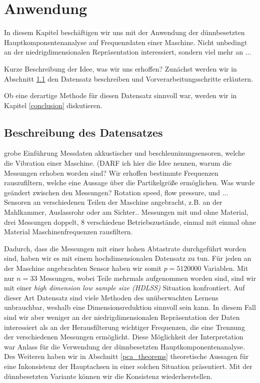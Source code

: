 \chapter{Anwendung}

\label{application}

In diesem Kapitel beschäftigen wir uns mit der Anwendung der dünnbesetzten Hauptkomponentenanalyse auf Frequenzdaten einer Maschine.
Nicht unbedingt an der niedrigdimensionalen Repräsentation interessiert, sondern viel mehr an ...
 
Kurze Beschreibung der Idee, was wir uns erhoffen?
Zunächst werden wir in Abschnitt \ref{data_set} den Datensatz beschreiben und Vorverarbeitungsschritte erläutern. 

Ob eine derartige Methode für diesen Datensatz sinnvoll war, werden wir in Kapitel \ref{conclusion} diskutieren.




\section{Beschreibung des Datensatzes}
\label{data_set}

grobe Einführung Messdaten akkustischer und beschleuninungsensoren, welche die Vibration einer Maschine. (DARF ich hier die Idee nennen, warum die Messungen erhoben worden sind? Wir erhoffen bestimmte Frequenzen rauszufiltern, welche eine Aussage über die Partikelgröße ermöglichen.
Was wurde geändert zwischen den Messungen? Rotation speed, flow pressure, und ...
Sensoren an verschiedenen Teilen der Maschine angebracht, z.B. an der Mahlkammer, Auslassrohr oder am Sichter..
Messungen mit und ohne Material, drei Messungen doppelt, 8 verschiedene Betriebszustände, einmal mit einmal ohne Material 
 Maschinenfrequenzen rausfiltern.

Dadurch, dass die Messungen mit einer hohen Abtastrate durchgeführt worden sind, haben wir es mit einem hochdimensionalen Datensatz zu tun. Für jeden an der Maschine angebrachten Sensor haben wir somit $p = 5120000$ Variablen. Mit nur $n = 33$ Messungen, wobei Teile mehrmals aufgenommen worden sind, sind wir mit einer \textit{high dimension low sample size (HDLSS)} Situation konfrontiert. Auf dieser Art Datensatz sind viele Methoden des unüberwachten Lernens unbrauchbar, weshalb eine Dimensionsreduktion sinnvoll sein kann. In diesem Fall sind wir aber weniger an der niedrigdimensionalen Repräsentation der Daten interessiert als an der Herausfilterung wichtiger Frequenzen, die eine Trennung der verschiedenen Messungen ermöglicht. Diese Möglichkeit der Interpretation war Anlass für die Verwendung der dünnbesetzten Hauptkomponentenanalyse. Des Weiteren haben wir in Abschnitt \ref{pca_theorems} theoretische Aussagen für eine Inkonsistenz der Hauptachsen in einer solchen Situation präsentiert. Mit der dünnbesetzten Variante können wir die Konsistenz wiederherstellen.

